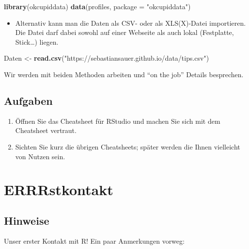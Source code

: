 \documentclass[12pt,ngerman,]{book}
\makeatletter
\newenvironment{Shaded}{\begin{snugshade}}{\end{snugshade}}
\newcommand{\KeywordTok}[1]{\textcolor[rgb]{0.13,0.29,0.53}{\textbf{{#1}}}}
\newcommand{\DataTypeTok}[1]{\textcolor[rgb]{0.13,0.29,0.53}{{#1}}}
\newcommand{\StringTok}[1]{\textcolor[rgb]{0.31,0.60,0.02}{{#1}}}
\newcommand{\NormalTok}[1]{{#1}}
\providecommand{\tightlist}{%
  \setlength{\itemsep}{0pt}\setlength{\parskip}{0pt}}
\newenvironment{kframe}{%
\medskip{}
\setlength{\fboxsep}{.8em}
 \def\at@end@of@kframe{}%
 \ifinner\ifhmode%
  \def\at@end@of@kframe{\end{minipage}}%
  \begin{minipage}{\columnwidth}%
 \fi\fi%
 \def\FrameCommand##1{\hskip\@totalleftmargin \hskip-\fboxsep
 \colorbox{shadecolor}{##1}\hskip-\fboxsep
     \hskip-\linewidth \hskip-\@totalleftmargin \hskip\columnwidth}%
 \MakeFramed {\advance\hsize-\width
   \@totalleftmargin\z@ \linewidth\hsize
   \@setminipage}}%
 {\par\unskip\endMakeFramed%
 \at@end@of@kframe}
\renewenvironment{Shaded}{\begin{kframe}}{\end{kframe}}
\makeatother
\begin{document}
\begin{Shaded}
\begin{Highlighting}[]
\KeywordTok{library}\NormalTok{(okcupiddata) }
\KeywordTok{data}\NormalTok{(profiles, }\DataTypeTok{package =} \StringTok{"okcupiddata"}\NormalTok{)}
\end{Highlighting}
\end{Shaded}

\begin{itemize}
\tightlist
\item
  Alternativ kann man die Daten als CSV- oder als XLS(X)-Datei
  importieren. Die Datei darf dabei sowohl auf einer Webseite als auch
  lokal (Festplatte, Stick\ldots{}) liegen.
\end{itemize}

\begin{Shaded}
\begin{Highlighting}[]
\NormalTok{Daten <-}\StringTok{ }\KeywordTok{read.csv}\NormalTok{(}\StringTok{"https://sebastiansauer.github.io/data/tips.csv"}\NormalTok{) }
\end{Highlighting}
\end{Shaded}

Wir werden mit beiden Methoden arbeiten und ``on the job'' Details
besprechen.

\subsection{Aufgaben}\label{aufgaben}

\begin{enumerate}
\def\labelenumi{\arabic{enumi}.}
\item
  Öffnen Sie das Cheatsheet für RStudio und machen Sie sich mit dem
  Cheatsheet vertraut.
\item
  Sichten Sie kurz die übrigen Cheatsheets; später werden die Ihnen
  vielleicht von Nutzen sein.
\end{enumerate}

\section{ERRRstkontakt}\label{errrstkontakt}

\subsection{Hinweise}\label{hinweise}

Unser erster Kontakt mit R! Ein paar Anmerkungen vorweg:
\end{document}
